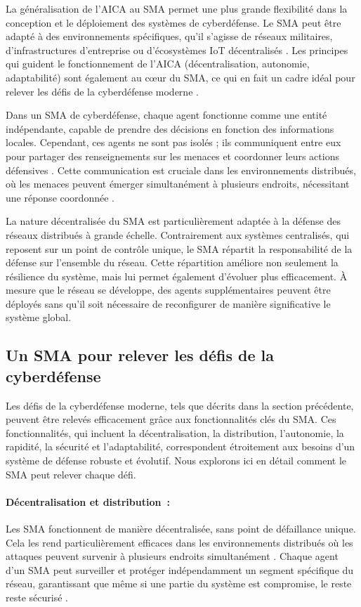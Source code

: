La généralisation de l'AICA au SMA permet une plus grande flexibilité dans la conception et le déploiement des systèmes de cyberdéfense. Le SMA peut être adapté à des environnements spécifiques, qu'il s'agisse de réseaux militaires, d'infrastructures d'entreprise ou d'écosystèmes IoT décentralisés \cite{kott2023autonomous}. Les principes qui guident le fonctionnement de l'AICA (décentralisation, autonomie, adaptabilité) sont également au cœur du SMA, ce qui en fait un cadre idéal pour relever les défis de la cyberdéfense moderne \cite{kolias2011swarm}.

Dans un SMA de cyberdéfense, chaque agent fonctionne comme une entité indépendante, capable de prendre des décisions en fonction des informations locales. Cependant, ces agents ne sont pas isolés ; ils communiquent entre eux pour partager des renseignements sur les menaces et coordonner leurs actions défensives \cite{kolias2011swarm}. Cette communication est cruciale dans les environnements distribués, où les menaces peuvent émerger simultanément à plusieurs endroits, nécessitant une réponse coordonnée \cite{bace2001intrusion}.

La nature décentralisée du SMA est particulièrement adaptée à la défense des réseaux distribués à grande échelle. Contrairement aux systèmes centralisés, qui reposent sur un point de contrôle unique, le SMA répartit la responsabilité de la défense sur l'ensemble du réseau. Cette répartition améliore non seulement la résilience du système, mais lui permet également d'évoluer plus efficacement. À mesure que le réseau se développe, des agents supplémentaires peuvent être déployés sans qu'il soit nécessaire de reconfigurer de manière significative le système global.

\subsection{Un SMA pour relever les défis de la cyberdéfense}

Les défis de la cyberdéfense moderne, tels que décrits dans la section précédente, peuvent être relevés efficacement grâce aux fonctionnalités clés du SMA. Ces fonctionnalités, qui incluent la décentralisation, la distribution, l'autonomie, la rapidité, la sécurité et l'adaptabilité, correspondent étroitement aux besoins d'un système de défense robuste et évolutif. Nous explorons ici en détail comment le SMA peut relever chaque défi.

\paragraph{Décentralisation et distribution :}
Les SMA fonctionnent de manière décentralisée, sans point de défaillance unique. Cela les rend particulièrement efficaces dans les environnements distribués où les attaques peuvent survenir à plusieurs endroits simultanément \cite{kolias2011swarm}. Chaque agent d'un SMA peut surveiller et protéger indépendamment un segment spécifique du réseau, garantissant que même si une partie du système est compromise, le reste reste sécurisé \cite{shakarian2015cyber}.

